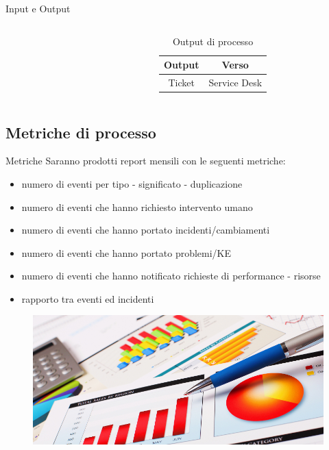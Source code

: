 \begin{frame}{Input e Output}
\begin{columns}
\begin{column}{0.3\textwidth}
\begin{figure}
\end{figure}
\end{column}
\begin{column}{0.7\textwidth}
\begin{table}
\begin{tabular}{ c | c }
\textbf{Output} & \textbf{Verso}\\
\hline
Ticket & Service Desk\\
\end{tabular}
\caption{Output di processo}
\end{table}
\end{column}
\end{columns}
\end{frame}

\subsection*{Metriche di processo}
\begin{frame}{Metriche}
Saranno prodotti report mensili con le seguenti metriche:
\begin{itemize}
\item{numero di eventi per tipo - significato - duplicazione}
\item{numero di eventi che hanno richiesto intervento umano}
\item{numero di eventi che hanno portato incidenti/cambiamenti}
\item{numero di eventi che hanno portato problemi/KE}
\item{numero di eventi che hanno notificato richieste di performance - risorse}
\item{rapporto tra eventi ed incidenti}
\end{itemize}
\begin{figure}
\includegraphics[scale=0.13]{Images/Metrics.png}
\end{figure}
\end{frame}

